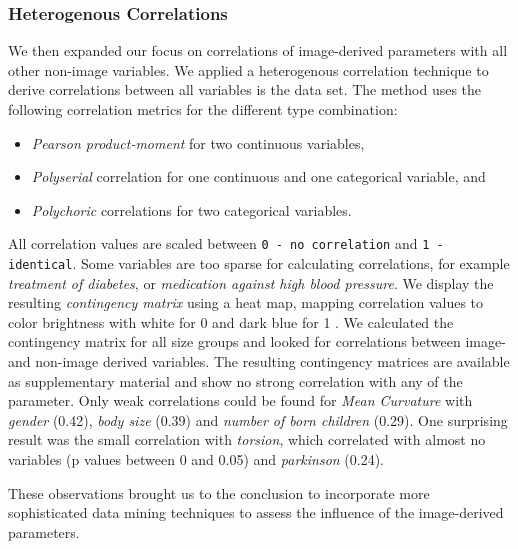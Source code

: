 \documentclass[a4paper,twoside]{style/article}
\begin{document}
\subsubsection{Heterogenous Correlations}
We then expanded our focus on correlations of image-derived parameters with all other non-image variables.
We applied a heterogenous correlation technique to derive correlations between all variables is the data set.
The method uses the following correlation metrics for the different type combination:
\begin{itemize}
\item \emph{Pearson product-moment} for two continuous variables, 
\item \emph{Polyserial} correlation for one continuous and one categorical variable, and
\item \emph{Polychoric} correlations for two categorical variables.
\end{itemize}
All correlation values are scaled between \texttt{0 - no correlation} and \texttt{1 - identical}.
Some variables are too sparse for calculating correlations, for example \emph{treatment of diabetes}, or \emph{medication against high blood pressure}.
We display the resulting \emph{contingency matrix} using a heat map, mapping correlation values to color brightness with white for 0 and dark blue for 1 \cite{Klemm2014VIS}.
We calculated the contingency matrix for all size groups and looked for correlations between image- and non-image derived variables.
The resulting contingency matrices are available as supplementary material and show no strong correlation with any of the parameter.
Only weak correlations could be found for \emph{Mean Curvature} with \emph{gender} (0.42), \emph{body size} (0.39) and \emph{number of born children} (0.29).
One surprising result was the small correlation with \emph{torsion}, which correlated with almost no variables (p values between 0 and 0.05) and \emph{parkinson} (0.24).

These observations brought us to the conclusion to incorporate more sophisticated data mining techniques to assess the influence of the image-derived parameters.
\end{document}
